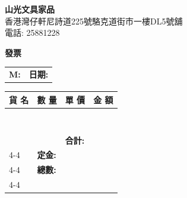 \documentclass[UTF8, fontset=none]{ctexrep}
\begin{document}
\pagestyle{empty}

\vfill
\begin{center}
\begin{minipage}{0.85\paperwidth}

\vspace{0.2cm}

\begin{center}
{\Large \textbf{山光文具家品}} \\[2pt]
{\footnotesize 香港灣仔軒尼詩道225號駱克道街市一樓DL5號舖} \\[3pt]
{\footnotesize 電話: 25881228}
\end{center}

\vspace{0.2cm}

\begin{center}
{\large \textbf{發票}}
\end{center}

\begin{center}
\begin{tabular*}{0.86\linewidth}{@{\extracolsep{\fill}}lr}
\textbf{M:} \underline{\hspace{4.5cm}} &
\textbf{日期:} \underline{\hspace{3cm}} \\
\end{tabular*}
\end{center}

\vspace{0.3cm}

\noindent
\begin{center}
\begin{tabularx}{0.86\linewidth}{|p{4.4cm}|p{1.35cm}|p{1.6cm}|p{1.71cm}|}
\hline
\centering \textbf{貨 名} &
\centering \textbf{數 量} &
\centering \textbf{單 價} &
\centering \textbf{金 額} \tabularnewline
\hline

& & &\\ \hline
& & &\\ \hline
& & &\\ \hline
& & &\\ \hline
& & &\\ \hline
& & &\\ \hline
& & &\\ \hline
& & &\\ \hline

\multicolumn{2}{r}{} &
\hfill \textbf{\footnotesize 合計:} &
\\ \cline{4-4}

\multicolumn{2}{r}{} &
\hfill \textbf{\footnotesize 定金:} &
\\ \cline{4-4}

\multicolumn{2}{r}{} &
\hfill \textbf{\footnotesize 總數:} &
\\ \cline{4-4}

\end{tabularx}
\end{center}

\vspace{0.5cm}

\end{minipage}
\end{center}
\vfill
\end{document}

